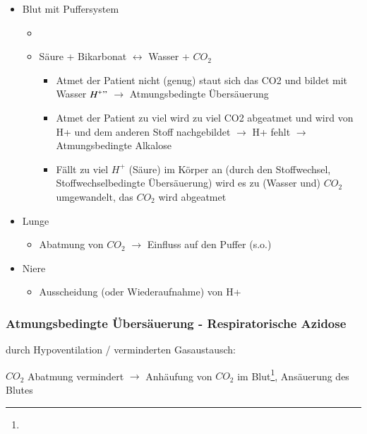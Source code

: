 \begin{itemize}
    \item Blut mit Puffersystem
    \begin{itemize}
        \item {}
        \item S\"aure {\tiny + Bikarbonat}
        ${\leftrightarrow}$ {\tiny Wasser +} $CO_2$
        \begin{itemize}
            \item Atmet der Patient nicht (genug) staut sich das CO2 und bildet mit
            Wasser $H^+"$ ${\rightarrow}$ Atmungsbedingte
            \"Ubers\"auerung
            \item Atmet der Patient zu viel wird zu viel CO2 abgeatmet und wird von
            H+ und dem anderen Stoff nachgebildet ${\rightarrow}$ H+ fehlt
            ${\rightarrow}$ Atmungsbedingte Alkalose
            \item F\"allt zu viel $H^+$ (S\"aure) im
            K\"orper an (durch den Stoffwechsel, Stoffwechselbedingte \"Ubers\"auerung) wird es zu (Wasser
            und) $CO_2$ umgewandelt, das $CO_2$ wird
            abgeatmet
        \end{itemize}
    \end{itemize}
    \item Lunge
    \begin{itemize}
        \item Abatmung von $CO_2$ ${\rightarrow}$ Einfluss auf den Puffer (s.o.)
    \end{itemize}
    \item Niere
    \begin{itemize}
        \item Ausscheidung (oder Wiederaufnahme)  von H+
    \end{itemize}
\end{itemize}

\subsubsection{Atmungsbedingte \"Ubers\"auerung - Respiratorische Azidose}
\label{bkm:RefHeading35233321}durch Hypoventilation / verminderten  Gasaustausch:

$CO_2$  Abatmung vermindert ${\rightarrow}$ Anhäufung von
$CO_2$ im Blut\footnote{}, Ans\"auerung des
Blutes

